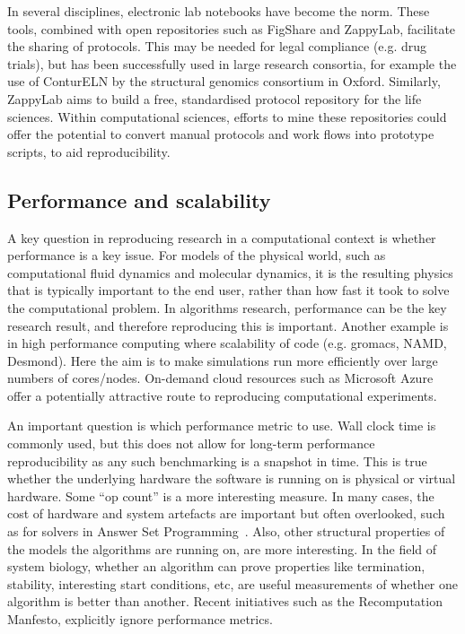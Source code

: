 \documentclass[conference]{IEEEtran}
\begin{document}
In several disciplines, electronic lab notebooks have become the
norm. These tools, combined with open repositories such as FigShare
and ZappyLab, facilitate the sharing of protocols. This may be needed for
legal compliance (e.g. drug trials), but has been successfully used in
large research consortia, for example the use of ConturELN by the
structural genomics consortium in Oxford. Similarly, ZappyLab aims to
build a free, standardised protocol repository for the life
sciences. Within computational sciences, efforts to mine these
repositories could offer the potential to convert manual protocols and
work flows into prototype scripts, to aid reproducibility.

\subsection{Performance and scalability}

A key question in reproducing research in a computational context is
whether performance is a key issue. For models of the physical world,
such as computational fluid dynamics and molecular dynamics, it is the
resulting physics that is typically important to the end user, rather
than how fast it took to solve the computational problem. In
algorithms research, performance can be the key research result, and
therefore reproducing this is important. Another example is in high
performance computing where scalability of code (e.g. gromacs, NAMD,
Desmond). Here the aim is to make simulations run more efficiently
over large numbers of cores/nodes. On-demand cloud resources such as
Microsoft Azure offer a potentially attractive route to reproducing
computational experiments.

An important question is which performance metric to use. Wall clock
time is commonly used, but this does not allow for long-term
performance reproducibility as any such benchmarking is a snapshot in
time. This is true whether the underlying hardware the software is
running on is physical or virtual hardware. Some ``op count'' is a
more interesting measure. In many cases, the cost of hardware and
system artefacts are important but often overlooked, such as for
solvers in Answer Set Programming~\cite{brain+devos:2009}. Also, other
structural properties of the models the algorithms are running on, are
more interesting. In the field of system biology, whether an algorithm
can prove properties like termination, stability, interesting start
conditions, etc, are useful measurements of whether one algorithm is
better than another. Recent initiatives such as the Recomputation
Manfesto, explicitly ignore performance metrics.
\end{document}

